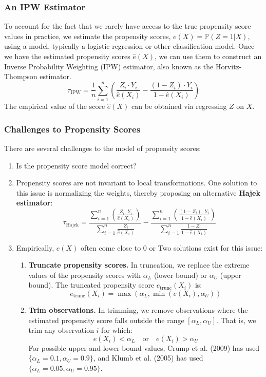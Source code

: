 \subsubsection{An IPW Estimator}
To account for the fact that we rarely have access to the true propensity score values in practice, we estimate the propensity scores, \( e(X) = \mathbb{P}(Z = 1 | X) \), using a model, typically a logistic regression or other classification model. Once we have the estimated propensity scores \(\hat{e}(X)\), we can use them to construct an Inverse Probability Weighting (IPW) estimator, also known as the Horvitz-Thompson estimator.
\begin{equation}
\tau_{\text{IPW}} = \frac{1}{n} \sum_{i=1}^{n} \left( \frac{Z_i \cdot Y_i}{\hat{e}(X_i)} - \frac{(1-Z_i) \cdot Y_i}{1 - \hat{e}(X_i)} \right)
\end{equation}
The empirical value of the score \(\hat{e}(X)\) can be obtained via regressing \(Z\) on \(X\).

\subsubsection{Challenges to Propensity Scores}
There are several challenges to the model of propensity scores:
\begin{enumerate}
    \item Is the propensity score model correct?
    \item Propensity scores are not invariant to local transformations. One solution to this issue is normalizing the weights, thereby proposing an alternative \textbf{Hajek estimator}:
    \begin{equation}
        \tau_{\text{Hajek}} = \frac{\sum_{i=1}^{n} \left( \frac{Z_i \cdot Y_i}{\hat{e}(X_i)} \right)}{\sum_{i=1}^{n} \frac{Z_i}{\hat{e}(X_i)}} - \frac{\sum_{i=1}^{n} \left( \frac{(1-Z_i) \cdot Y_i}{1 - \hat{e}(X_i)} \right)}{\sum_{i=1}^{n} \frac{1-Z_i}{1 - \hat{e}(X_i)}}
    \end{equation}
    \item Empirically, \(e(X)\) often come close to 0 or Two solutions exist for this issue:
    \begin{enumerate}
        \item \textbf{Truncate propensity scores.} In truncation, we replace the extreme values of the propensity scores with \(\alpha_L\) (lower bound) or \(\alpha_U\) (upper bound). The truncated propensity score \(e_{\text{trunc}}(X_i)\) is:
            \[
            e_{\text{trunc}}(X_i) = \max\left( \alpha_L, \min\left( e(X_i), \alpha_U \right)\right)
            \]
        \item \textbf{Trim observations.} In trimming, we remove observations where the estimated propensity score falls outside the range \([\alpha_L, \alpha_U]\). That is, we trim any observation \(i\) for which:
            \[
            e(X_i) < \alpha_L \quad \text{or} \quad e(X_i) > \alpha_U
            \]
        For possible upper and lower bound values, Crump et al. (2009) has used \(\{\alpha_L = 0.1, \alpha_U = 0.9\}\), and Klumb et al. (2005) has used \(\{\alpha_L = 0.05, \alpha_U = 0.95\}\).
    \end{enumerate}
\end{enumerate}

